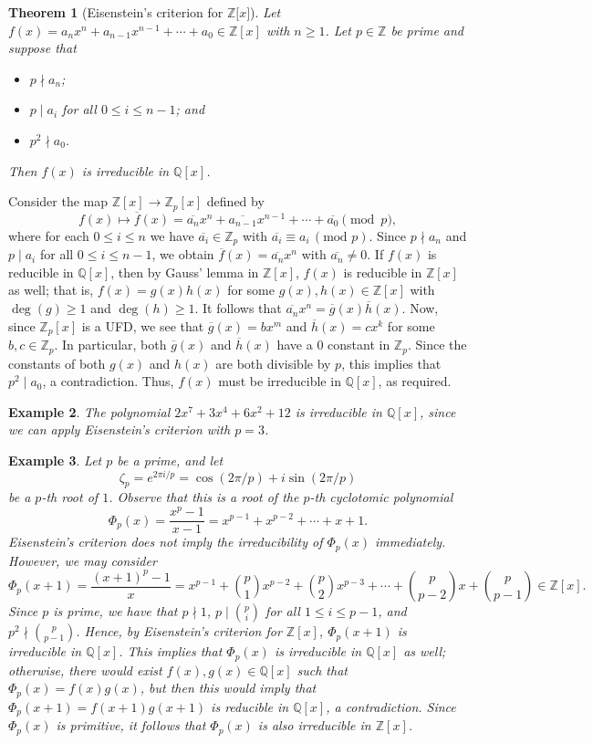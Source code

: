\documentclass[10pt]{article}
\makeatletter
\newcommand{\Z}{\mathbb{Z}}
\newcommand{\Q}{\mathbb{Q}}
\theoremstyle{newstyle}
\newtheorem{thm}{Theorem}[section]
\newtheorem{exmp}[thm]{Example}
\newenvironment{pf}[1][\proofname]{\par
  \pushQED{\qed}%
  \normalfont \topsep0\p@\relax
  \trivlist
  \item[\hskip\labelsep\scshape
  #1\@addpunct{.}]\ignorespaces
}{%
  \popQED\endtrivlist\@endpefalse
}
\makeatother
\begin{document}
\begin{thm}[Eisenstein's criterion for $\Z[x{]}$]
Let $f(x) = a_n x^n + a_{n-1} x^{n-1} + \cdots + a_0 \in \Z[x]$ with $n \geq 1$. 
Let $p \in \Z$ be prime and suppose that
\begin{itemize}
    \item $p \nmid a_n$;
    \item $p \mid a_i$ for all $0 \leq i \leq n-1$; and 
    \item $p^2 \nmid a_0$.
\end{itemize}
Then $f(x)$ is irreducible in $\Q[x]$.
\end{thm}
\begin{pf}
Consider the map $\Z[x] \to \Z_p[x]$ defined by 
\[ f(x) \mapsto \overline{f}(x) = \overline{a_n}x^n + \overline{a_{n-1}}x^{n-1} + \cdots + \overline{a_0}
\pmod p, \]
where for each $0 \leq i \leq n$ we have $\overline{a_i} \in \Z_p$ with $\overline{a_i} 
\equiv a_i \, (\text{mod } p)$. Since $p \nmid a_n$ and $p \mid a_i$ for all $0 \leq i \leq n-1$, 
we obtain $\overline{f}(x) = \overline{a_n}x^n$ with $\overline{a_n} \neq 0$. If 
$f(x)$ is reducible in $\Q[x]$, then by Gauss' lemma in $\Z[x]$, $f(x)$ is reducible in $\Z[x]$
as well; that is, $f(x) = g(x)h(x)$ for some $g(x), h(x) \in \Z[x]$ with $\deg(g) \geq 1$ and 
$\deg(h) \geq 1$. It follows that $\overline{a_n}x^n = \overline{g}(x) \overline{h}(x)$. 
Now, since $\Z_p[x]$ is a UFD, we see that $\overline{g}(x) = bx^m$ and $\overline{h}(x) = cx^k$ 
for some $b, c \in \Z_p$. In particular, both $\overline{g}(x)$ and $\overline{h}(x)$ have a $0$ constant 
in $\Z_p$. Since the constants of both $g(x)$ and $h(x)$ are both divisible by $p$, this implies that 
$p^2 \mid a_0$, a contradiction. Thus, $f(x)$ must be irreducible in $\Q[x]$, as required.
\end{pf}

\begin{exmp}
The polynomial $2x^7 + 3x^4 + 6x^2 + 12$ is irreducible in $\Q[x]$, since we can apply Eisenstein's 
criterion with $p = 3$.
\end{exmp}

\begin{exmp}
Let $p$ be a prime, and let 
\[ \zeta_p = e^{2\pi i/p} = \cos(2\pi/p) + i\sin(2\pi/p) \]
be a $p$-th root of $1$. Observe that this is a root of the $p$-th cyclotomic polynomial 
\[ \Phi_p(x) = \frac{x^p-1}{x-1} = x^{p-1} + x^{p-2} + \cdots + x + 1. \]
Eisenstein's criterion does not imply the irreducibility of $\Phi_p(x)$ immediately. 
However, we may consider 
\[ \Phi_p(x+1) = \frac{(x+1)^p - 1}{x} = x^{p-1} + \binom{p}1 x^{p-2} + \binom{p}2 x^{p-3} 
+ \cdots + \binom{p}{p-2}x + \binom{p}{p-1} \in \Z[x]. \]
Since $p$ is prime, we have that $p \nmid 1$, $p \mid \binom{p}i$ for all $1 \leq i \leq p-1$, 
and $p^2 \nmid \binom{p}{p-1}$. Hence, by Eisenstein's criterion for $\Z[x]$, 
$\Phi_p(x+1)$ is irreducible in $\Q[x]$. This implies that $\Phi_p(x)$ is irreducible in $\Q[x]$ 
as well; otherwise, there would exist $f(x), g(x) \in \Q[x]$ such that 
$\Phi_p(x) = f(x)g(x)$, but then this would imply that $\Phi_p(x+1) = f(x+1)g(x+1)$ is reducible
in $\Q[x]$, a contradiction. Since $\Phi_p(x)$ is primitive, it follows that $\Phi_p(x)$ is 
also irreducible in $\Z[x]$.
\end{exmp}
\end{document}

